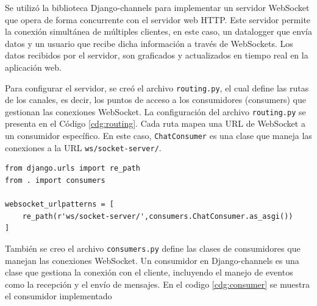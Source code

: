 Se utilizó la biblioteca Django-channels para implementar un servidor WebSocket que opera de forma concurrente con el servidor web HTTP. Este servidor permite la conexión simultánea de múltiples clientes, en este caso, un datalogger que envía datos y un usuario que recibe dicha información a través de WebSockets. Los datos recibidos por el servidor, son graficados y actualizados en tiempo real en la aplicación web.

Para configurar el servidor, se creó el archivo \texttt{routing.py}, el cual define las rutas de los canales, es decir, los puntos de acceso a los consumidores (consumers) que gestionan las conexiones WebSocket. La configuración del archivo \texttt{routing.py} se presenta en el Código \ref{cdg:routing}. Cada ruta mapea una URL de WebSocket a un consumidor específico. En este caso, \texttt{ChatConsumer} es una clase que maneja las conexiones a la URL \texttt{ws/socket-server/}.



\begin{lstlisting}[style=pythonstyle, caption={Configuracion del routing para gestionar las conexiones de clientes al servidor WebSocket.}, label=cdg:routing,basicstyle=\ttfamily\fontsize{8}{8}\selectfont]
from django.urls import re_path
from . import consumers

websocket_urlpatterns = [
    re_path(r'ws/socket-server/',consumers.ChatConsumer.as_asgi())
]
\end{lstlisting}

También se creo el archivo \texttt{consumers.py} define las clases de consumidores que manejan las conexiones WebSocket. Un consumidor en Django-channels es una clase que gestiona la conexión con el cliente, incluyendo el manejo de eventos como la recepción y el envío de mensajes. En el codigo \ref{cdg:consumer} se muestra el consumidor implementado

